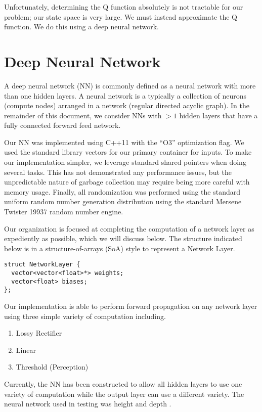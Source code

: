 Unfortunately, determining the Q function absolutely is not tractable for our problem; our state space is very large.
We must instead approximate the Q function.
We do this using a deep neural network.

\section*{Deep Neural Network}
A deep neural network (NN) is commonly defined as a neural network with more than one hidden layers.
A neural network is a typically a collection of neurons (compute nodes) arranged in a network (regular directed acyclic graph).
In the remainder of this document, we consider NNs with $>1$ hidden layers that have a fully connected forward feed network.

Our NN was implemented using C++11 with the ``O3'' optimization flag.
We used the standard library vectors for our primary container for inputs.
To make our implementation simpler, we leverage standard shared pointers when doing several tasks.
This has not demonstrated any performance issues, but the unpredictable nature of garbage collection may require being more careful with memory usage.
Finally, all randomization was performed using the standard uniform random number generation distribution using the standard Mersene Twister 19937 random number engine.

Our organization is focused at completing the computation of a network layer as expediently as possible, which we will discuss below.
The structure indicated below is in a structure-of-arrays (SoA) style to represent a Network Layer.

\begin{lstlisting}
struct NetworkLayer {
  vector<vector<float>*> weights;
  vector<float> biases;
};
\end{lstlisting}

Our implementation is able to perform forward propagation on any network layer using three simple variety of computation including.
\begin{enumerate}
\item Lossy Rectifier
\item Linear
\item Threshold (Perception)
\end{enumerate}
Currently, the NN has been constructed to allow all hidden layers to use one variety of computation while the output layer can use a different variety.
The neural network used in testing was height \netheight and depth \netdepth.

